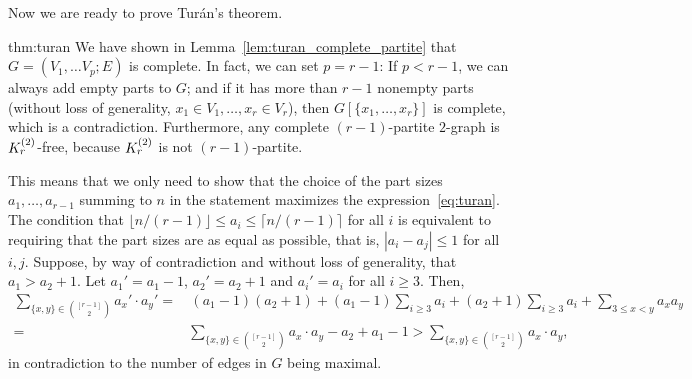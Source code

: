 Now we are ready to prove Turán's theorem.
\begin{delayedproof}{thm:turan}
    We have shown in Lemma~\ref{lem:turan_complete_partite} that $G = (V_1, \dots V_p; E)$ is complete.
    In fact, we can set $p = r - 1$:
    If $p < r - 1$, we can always add empty parts to $G$; and if it has more than $r - 1$ nonempty parts
    (without loss of generality, $x_1 \in V_1, \dots, x_r \in V_r$), then $G[\{x_1, \dots, x_r\}]$ is complete,
    which is a contradiction.
    Furthermore, any complete $(r-1)$-partite $2$-graph is $K^{(2)}_{r}$-free,
    because $K^{(2)}_{r}$ is not $(r-1)$-partite.

    This means that we only need to show that the choice of the part sizes $a_1, \dots, a_{r-1}$ summing to $n$
    in the statement maximizes the expression~\eqref{eq:turan}.
    The condition that $\lfloor n / (r-1) \rfloor \leq a_i \leq \lceil n / (r-1) \rceil$ for all $i$
    is equivalent to requiring that the part sizes are as equal as possible, that is,
    $|a_i - a_j| \leq 1$ for all $i, j$.
    Suppose, by way of contradiction and without loss of generality, that $a_1 > a_2 + 1$.
    Let $a_1' = a_1 - 1$, $a_2' = a_2 + 1$ and $a_i' = a_i$ for all $i \geq 3$.
    Then,
    \begin{align*}
        \sum_{\{x, y\} \in \binom{[r-1]}{2}} a_x' \cdot a_y'
        =& \, (a_1 - 1)(a_2 + 1) + (a_1 - 1) \sum_{i \geq 3} a_i + (a_2 + 1) \sum_{i \geq 3} a_i + \sum_{3 \leq x < y} a_x a_y \\
        =& \sum_{\{x, y\} \in \binom{[r-1]}{2}} a_x \cdot a_y - a_2 + a_1 - 1
        > \sum_{\{x, y\} \in \binom{[r-1]}{2}} a_x \cdot a_y,
    \end{align*}
    in contradiction to the number of edges in $G$ being maximal.
\end{delayedproof}

